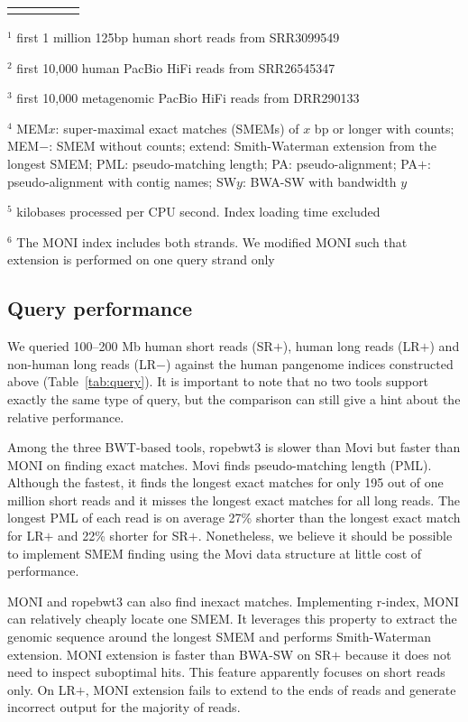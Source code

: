 \documentclass[webpdf,contemporary,large,namedate]{oup-authoring-template}%
\begin{document}
\begin{table}[!tb]
\begin{tabular*}{\columnwidth}{@{\extracolsep\fill}lllrr@{\extracolsep\fill}}
\botrule
\end{tabular*}
\begin{tablenotes}\setlength\itemsep{0.0em}
\item[$^1$] first 1 million 125bp human short reads from SRR3099549
\item[$^2$] first 10,000 human PacBio HiFi reads from SRR26545347
\item[$^3$] first 10,000 metagenomic PacBio HiFi reads from DRR290133
\item[$^4$] MEM$x$: super-maximal exact matches (SMEMs) of $x$ bp or longer with counts;
MEM$-$: SMEM without counts;
extend: Smith-Waterman extension from the longest SMEM;
PML: pseudo-matching length; PA: pseudo-alignment; PA$+$: pseudo-alignment with contig names;
SW$y$: BWA-SW with bandwidth $y$
\item[$^5$] kilobases processed per CPU second. Index loading time excluded
\item[$^6$] The MONI index includes both strands.
We modified MONI such that extension is performed on one query strand only
\end{tablenotes}
\end{table}

\subsection{Query performance}

We queried 100--200 Mb human short reads (SR$+$), human long reads (LR$+$) and non-human long reads (LR$-$) against the human pangenome indices constructed above (Table~\ref{tab:query}).
It is important to note that no two tools support exactly the same type of query,
but the comparison can still give a hint about the relative performance.

Among the three BWT-based tools, ropebwt3 is slower than Movi but faster than MONI on finding exact matches.
Movi finds pseudo-matching length (PML).
Although the fastest, it finds the longest exact matches for only 195 out of one million short reads
and it misses the longest exact matches for all long reads.
The longest PML of each read is on average 27\% shorter than the longest exact match for LR$+$ and 22\% shorter for SR$+$.
Nonetheless, we believe it should be possible to implement SMEM finding using the Movi data structure at little cost of performance.

MONI and ropebwt3 can also find inexact matches.
Implementing r-index, MONI can relatively cheaply locate one SMEM.
It leverages this property to extract the genomic sequence around the longest SMEM and performs Smith-Waterman extension.
MONI extension is faster than BWA-SW on SR$+$ because it does not need to inspect suboptimal hits.
This feature apparently focuses on short reads only.
On LR$+$, MONI extension fails to extend to the ends of reads and generate incorrect output for the majority of reads.
\end{document}
